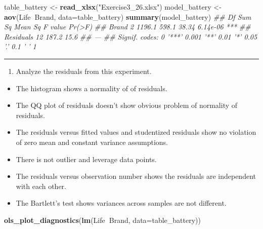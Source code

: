 \documentclass[]{article}
\newenvironment{Shaded}{\begin{snugshade}}{\end{snugshade}}
\newcommand{\CommentTok}[1]{\textcolor[rgb]{0.56,0.35,0.01}{\textit{#1}}}
\newcommand{\DataTypeTok}[1]{\textcolor[rgb]{0.13,0.29,0.53}{#1}}
\newcommand{\KeywordTok}[1]{\textcolor[rgb]{0.13,0.29,0.53}{\textbf{#1}}}
\newcommand{\NormalTok}[1]{#1}
\newcommand{\OperatorTok}[1]{\textcolor[rgb]{0.81,0.36,0.00}{\textbf{#1}}}
\newcommand{\StringTok}[1]{\textcolor[rgb]{0.31,0.60,0.02}{#1}}
\providecommand{\tightlist}{%
  \setlength{\itemsep}{0pt}\setlength{\parskip}{0pt}}
\begin{document}
\begin{Shaded}
\begin{Highlighting}[]
\NormalTok{table_battery <-}\StringTok{ }\KeywordTok{read_xlsx}\NormalTok{(}\StringTok{"Exercise3_26.xlsx"}\NormalTok{)}
\NormalTok{model_battery <-}\StringTok{ }\KeywordTok{aov}\NormalTok{(Life}\OperatorTok{~}\NormalTok{Brand, }\DataTypeTok{data=}\NormalTok{table_battery)}
\KeywordTok{summary}\NormalTok{(model_battery)}
\CommentTok{##             Df Sum Sq Mean Sq F value   Pr(>F)    }
\CommentTok{## Brand        2 1196.1   598.1   38.34 6.14e-06 ***}
\CommentTok{## Residuals   12  187.2    15.6                     }
\CommentTok{## ---}
\CommentTok{## Signif. codes:  0 '***' 0.001 '**' 0.01 '*' 0.05 '.' 0.1 ' ' 1}
\end{Highlighting}
\end{Shaded}

\begin{center}\rule{0.5\linewidth}{\linethickness}\end{center}

\begin{enumerate}
\def\labelenumi{(\alph{enumi})}
\setcounter{enumi}{1}
\tightlist
\item
  Analyze the residuals from this experiment.
\end{enumerate}

\begin{itemize}
\tightlist
\item
  The histogram shows a normality of of residuals.
\item
  The QQ plot of residuals doesn't show obvious problem of normality of
  residuals.
\item
  The residuals versus fitted values and studentized residuals show no
  violation of zero mean and constant variance assumptions.
\item
  There is not outlier and leverage data points.
\item
  The residuals versus observation number shows the residuals are
  independent with each other.
\item
  The Bartlett's test shows variances across samples are not different.
\end{itemize}

\begin{Shaded}
\begin{Highlighting}[]
\KeywordTok{ols_plot_diagnostics}\NormalTok{(}\KeywordTok{lm}\NormalTok{(Life}\OperatorTok{~}\NormalTok{Brand, }\DataTypeTok{data=}\NormalTok{table_battery))}
\end{Highlighting}
\end{Shaded}
\end{document}

